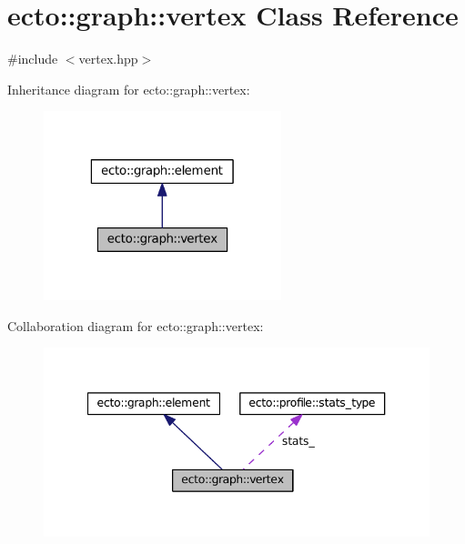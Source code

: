 \hypertarget{classecto_1_1graph_1_1vertex}{\section{ecto\-:\-:graph\-:\-:vertex Class Reference}
\label{classecto_1_1graph_1_1vertex}
}


{\ttfamily \#include $<$vertex.\-hpp$>$}



Inheritance diagram for ecto\-:\-:graph\-:\-:vertex\-:\nopagebreak
\begin{figure}[H]
\begin{center}
\leavevmode
\includegraphics[width=196pt]{classecto_1_1graph_1_1vertex__inherit__graph}
\end{center}
\end{figure}


Collaboration diagram for ecto\-:\-:graph\-:\-:vertex\-:\nopagebreak
\begin{figure}[H]
\begin{center}
\leavevmode
\includegraphics[width=343pt]{classecto_1_1graph_1_1vertex__coll__graph}
\end{center}
\end{figure}
